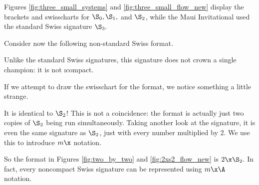 {    Figures \ref{fig:three_small_systems} and \ref{fig:three_small_flow_new} display the brackets and swisscharts for $\S_0, \S_1,$ and $\S_2$, while the Maui Invitational used the standard Swiss signature $\S_3.$


    \newpage

    Consider now the following non-standard Swiss format.
    

    Unlike the standard Swiss signatures, this signature does not crown a single champion: it is not \i{compact}.


    If we attempt to draw the swisschart for the format, we notice something a little strange.


    It is identical to $\S_2$! This is not a coincidence: the format is actually just two copies of $\S_2$ being run simultaneously. Taking another look at the signature, it is even the same signature as $\S_2$, just with every number multiplied by 2. We use this to introduce $m\x$ notation.


    So the format in Figures \ref{fig:two_by_two} and \ref{fig:2xs2_flow_new} is $2\x\S_2.$ In fact, every noncompact Swiss signature can be represented using $m\x\A$ notation.

    }
